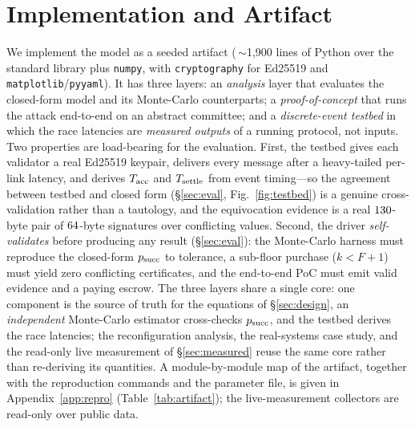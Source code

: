 \section{Implementation and Artifact}
\label{sec:impl}

We implement the model as a seeded artifact (\,$\sim$1{,}900 lines of Python over the standard library
plus \texttt{numpy}, with \texttt{cryptography} for Ed25519 and \texttt{matplotlib}/\texttt{pyyaml}). It
has three layers: an \emph{analysis} layer that evaluates the closed-form model and its Monte-Carlo
counterparts; a \emph{proof-of-concept} that runs the attack end-to-end on an abstract committee; and a
\emph{discrete-event testbed} in which the race latencies are \emph{measured outputs} of a running
protocol, not inputs. Two properties are load-bearing for the evaluation. First, the testbed gives each
validator a real Ed25519 keypair, delivers every message after a heavy-tailed per-link latency, and
derives $T_{\mathrm{acc}}$ and $T_{\mathrm{settle}}$ from event timing---so the agreement between testbed and closed form
(\S\ref{sec:eval}, Fig.~\ref{fig:testbed}) is a genuine cross-validation rather than a tautology, and
the equivocation evidence is a real $130$-byte pair of $64$-byte
signatures over conflicting values. Second, the driver \emph{self-validates} before producing any
result (\S\ref{sec:eval}): the Monte-Carlo harness must reproduce the closed-form $p_{\mathrm{succ}}$ to tolerance,
a sub-floor purchase ($k<F{+}1$) must yield zero conflicting certificates, and the end-to-end PoC must
emit valid evidence and a paying escrow. The three layers share a single core: one component is the
source of truth for the equations of \S\ref{sec:design}, an \emph{independent} Monte-Carlo estimator
cross-checks $p_{\mathrm{succ}}$, and the testbed derives the race latencies; the reconfiguration analysis, the
real-systems case study, and the read-only live measurement of \S\ref{sec:measured} reuse the same
core rather than re-deriving its quantities. A module-by-module map of the artifact, together with the
reproduction commands and the parameter file, is given in Appendix~\ref{app:repro}
(Table~\ref{tab:artifact}); the live-measurement collectors are read-only over public data.
